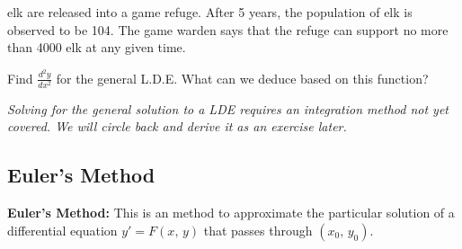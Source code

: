 \documentclass[addpoints, 12pt]{exam}
\begin{document}
\begin{questions}
    \setcounter{question}{1}
     elk are released into a game refuge. After 5 years, the population of elk is observed to be 104. The game warden says that the refuge can support no more than 4000 elk at any given time.
    
    \question Find $\displaystyle\frac{d^2 y}{dx^2}$ for the general L.D.E. What can we deduce based on this function?
\end{questions}


\textit{\footnotesize Solving for the general solution to a LDE requires an integration method not yet covered. We will circle back and derive it as an exercise later.}


\newpage
{}
\subsection*{Euler's Method}


\textbf{Euler's Method:} This is an method to approximate the particular solution of a differential equation $y'=F(x,\,y)$ that passes through $(x_0,\,y_0)$.
\end{document}
